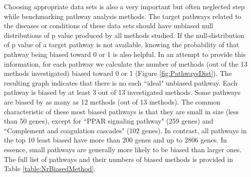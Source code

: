 Choosing appropriate data sets is also a very important but often neglected step while benchmarking pathway analysis methods. 
The target pathways related to the diseases or conditions of these data sets should have unbiased null distributions of p value produced by all methods studied. If the null-distribution of p value of a target pathway is not available, knowing the probability of that pathway being biased toward 0 or 1 is also helpful. 
In an attempt to provide this information, for each pathway we calculate the number of methods (out of the 13 methods investigated) biased toward 0 or 1 (Figure \ref{fig:PathwaysDist}). 
The resulting graph indicates that there is no such ``ideal" unbiased pathway.
Each pathway is biased by at least 3 out of 13 investigated methods. 
Some pathways are biased by as many as 12 methods (out of 13 methods).
The common characteristic of these most biased pathways is that they are small in size (less than 50 genes), except for ``PPAR signaling pathway" (259 genes) and ``Complement and coagulation cascades" (102 genes).
In contrast, all pathways in the top 10 least biased have more than 200 genes and up to 2806 genes. In essence, small pathways are generally more likely to be biased than larger ones.
The full list of pathways and their numbers of biased methods is provided in Table \ref{table:NrBiasedMethod}.


